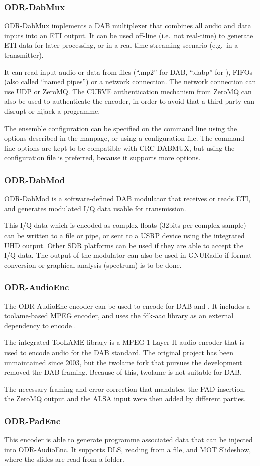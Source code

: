 \subsubsection{ODR-DabMux}
ODR-DabMux implements a DAB multiplexer that combines all audio and data inputs
into an ETI output. It can be used off-line (i.e.~not real-time) to generate ETI
data for later processing, or in a real-time streaming scenario (e.g.~in a
transmitter).

It can read input audio or data from files (``.mp2'' for DAB, ``.dabp'' for
\dabplus), FIFOs (also called ``named pipes'') or a network connection. The
network connection can use UDP or ZeroMQ. The CURVE authentication mechanism
from ZeroMQ can also be used to authenticate the encoder, in order to avoid that
a third-party can disrupt or hijack a programme.

The ensemble configuration can be specified on the command line using the
options described in the manpage, or using a configuration file. The command
line options are kept to be compatible with CRC-DABMUX, but using the
configuration file is preferred, because it supports more options.


\subsubsection{ODR-DabMod}
ODR-DabMod is a software-defined DAB modulator that receives or reads ETI, and
generates modulated I/Q data usable for transmission.

This I/Q data which is encoded as complex floats (32bits per complex sample) can
be written to a file or pipe, or sent to a USRP device using the integrated UHD
output. Other SDR platforms can be used if they are able to accept the I/Q data.
The output of the modulator can also be used in GNURadio if format conversion or
graphical analysis (spectrum) is to be done.

\subsubsection{ODR-AudioEnc}
The ODR-AudioEnc encoder can be used to encode for DAB and \dabplus. It includes
a toolame-based MPEG encoder, and uses the \mbox{fdk-aac} library as an external
dependency to encode \dabplus{}.

The integrated TooLAME library is a MPEG-1 Layer II audio encoder that is used
to encode audio for the DAB standard. The original project has been unmaintained
since 2003, but the twolame fork that pursues the development removed the DAB
framing. Because of this, twolame is not suitable for DAB.

The necessary framing and error-correction that \dabplus{} mandates, the PAD
insertion, the ZeroMQ output and the ALSA input were then added by different
parties.

\subsubsection{ODR-PadEnc}
This encoder is able to generate programme associated data that can be injected
into ODR-AudioEnc. It supports DLS, reading from a file, and MOT Slideshow,
where the slides are read from a folder.



